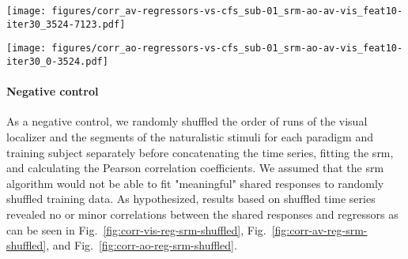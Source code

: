 \begin{figure*}[tbp]
\centering
\texttt{[image: figures/corr\_av-regressors-vs-cfs\_sub-01\_srm-ao-av-vis\_feat10-iter30\_3524-7123.pdf]}
\caption{
%
\textbf{Pearson correlation coefficients between regressors of the movie
and shared features}
%
The time series of the shared features within the multi-paradigm \ac{cfs}
%
(as calculated for subject 01 in the first fold of the cross-validation)
%
were trimmed to match the corresponding \acp{tr} of the movie
\citep{hanke2016simultaneous}.
%
The regressors \texttt{vse\_new} to \texttt{vno\_cut} are based on
annotations movie frames, whereas the regressors
\texttt{fg\_av\_ger\_lr} to \texttt{fg\_av\_ger\_ud} represent low-level
visual or auditory confounds
\citep[cf. Table 3 in][]{haeusler2022processing}.
}
\label{fig:corr-av-reg-srm}
\end{figure*}


\begin{figure*}[tbp]
\centering
\texttt{[image: figures/corr\_ao-regressors-vs-cfs\_sub-01\_srm-ao-av-vis\_feat10-iter30\_0-3524.pdf]}
\caption{
%
\textbf{Pearson correlation coefficients between regressors of the
audio-description and shared features.}
%
The time series of the shared features within the multi-paradigm \ac{cfs}
%
(as calculated for subject 01 in the first fold of the cross-validation)
%
were trimmed to match the corresponding \acp{tr} of the
audio-description \citep{hanke2014audiomovie}.
%
The regressors \texttt{body} to \texttt{sex\_m} are based on
annotations of nouns spoken by the audio-description's narrator,
whereas the regressors \texttt{fg\_ad\_ger\_lrdiff} and
\texttt{fg\_ad\_ger\_rms} represent low-level auditory confounds
\citep[cf. Table 3 in][]{haeusler2022processing}.
%
\texttt{geo\&groom} is a combination of
regressors as used on the positive side of the primary contrasts aimed to
localize the \ac{ppa} \citep[cf. Table 5 in][]{haeusler2022processing}.
}
\label{fig:corr-ao-reg-srm}
\end{figure*}


\paragraph{Negative control}


As a negative control, we randomly shuffled the order of runs of the visual
localizer and the segments of the naturalistic stimuli for each paradigm and
training subject separately before concatenating the time series, fitting the
\ac{srm}, and calculating the Pearson correlation coefficients.
%
We assumed that the \ac{srm} algorithm would not be able to fit "meaningful"
 shared responses to randomly shuffled training data.
%
As hypothesized, results based on shuffled time series revealed no or minor
correlations between the shared responses and regressors as can be seen in
Fig.~\ref{fig:corr-vis-reg-srm-shuffled},
Fig.~\ref{fig:corr-av-reg-srm-shuffled}, and
Fig.~\ref{fig:corr-ao-reg-srm-shuffled}.

